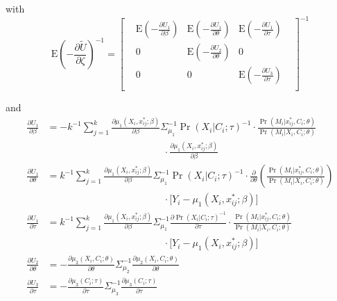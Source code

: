 \documentclass[]{article}
\begin{document}
\noindent with 
\[
\renewcommand\arraystretch{2.5}
\displaystyle \mbox{E}\left(-\frac{\partial \tilde U}{\partial \zeta}\right)^{-1} = 
\begin{bmatrix}
& \displaystyle\mbox{E}\left(-\frac{\partial U_1}{\partial \beta}\right) & \displaystyle\mbox{E}\left(-\frac{\partial U_1}{\partial \theta}\right) & \displaystyle\mbox{E}\left(-\frac{\partial U_1}{\partial \tau}\right) &\\
& 0 & \displaystyle\mbox{E}\left(-\frac{\partial U_2}{\partial \theta}\right) & 0 &\\
& 0 & 0 & \displaystyle\mbox{E}\left(-\frac{\partial U_3}{\partial \tau}\right) &\\
\end{bmatrix}^{-1}
\]

\noindent and
\begin{align*}
\displaystyle \frac{\partial U_1}{\partial \beta} &= - k^{-1} \sum_{j=1}^{k} \frac{\partial \mu_1(X_i,x^*_{ij};\beta)}{\partial \beta} \Sigma_{\mu_1}^{-1} \Pr(X_i\vert C_i;\tau)^{-1} \cdot \frac{\Pr(M_i\vert x^*_{ij},C_i;\theta)}{\Pr(M_i\vert X_i,C_i;\theta)}\\[-0.6em] & \qquad \qquad \qquad \qquad \qquad \qquad \cdot \frac{\partial \mu_1(X_i,x^*_{ij};\beta)}{\partial \beta}\\[0.6em]
\displaystyle \frac{\partial U_1}{\partial \theta} &= k^{-1} \sum_{j=1}^{k} \frac{\partial \mu_1(X_i,x^*_{ij};\beta)}{\partial \beta} \Sigma_{\mu_1}^{-1} \Pr(X_i\vert C_i;\tau)^{-1} \cdot \frac{\partial}{\partial \theta}\left(\frac{\Pr(M_i\vert x^*_{ij},C_i;\theta)}{\Pr(M_i\vert X_i,C_i;\theta)}\right)\\[-0.6em] & \qquad \qquad \qquad \qquad \qquad \qquad \cdot \big[ Y_i - \mu_1(X_i,x^*_{ij};\beta) \big]\\[0.6em]
\displaystyle \frac{\partial U_1}{\partial \tau} &= k^{-1} \sum_{j=1}^{k} \frac{\partial \mu_1(X_i,x^*_{ij};\beta)}{\partial \beta} \Sigma_{\mu_1}^{-1} \frac{\partial \Pr(X_i\vert C_i;\tau)^{-1}}{\partial \tau} \cdot \frac{\Pr(M_i\vert x^*_{ij},C_i;\theta)}{\Pr(M_i\vert X_i,C_i;\theta)}\\[-0.6em] & \qquad \qquad \qquad \qquad \qquad \qquad \cdot \big[ Y_i - \mu_1(X_i,x^*_{ij};\beta) \big]\\[0.6em]
\displaystyle \frac{\partial U_2}{\partial \theta} &= - \frac{\partial \mu_2(X_i,C_i;\theta)}{\partial \theta} \Sigma_{\mu_2}^{-1} \frac{\partial \mu_2(X_i,C_i;\theta)}{\partial \theta}\\[0.6em]
\displaystyle \frac{\partial U_3}{\partial \tau} &= - \frac{\partial \mu_3(C_i;\tau)}{\partial \tau} \Sigma_{\mu_3}^{-1} \frac{\partial \mu_3(C_i;\tau)}{\partial \tau}
\end{align*}
\end{document}
